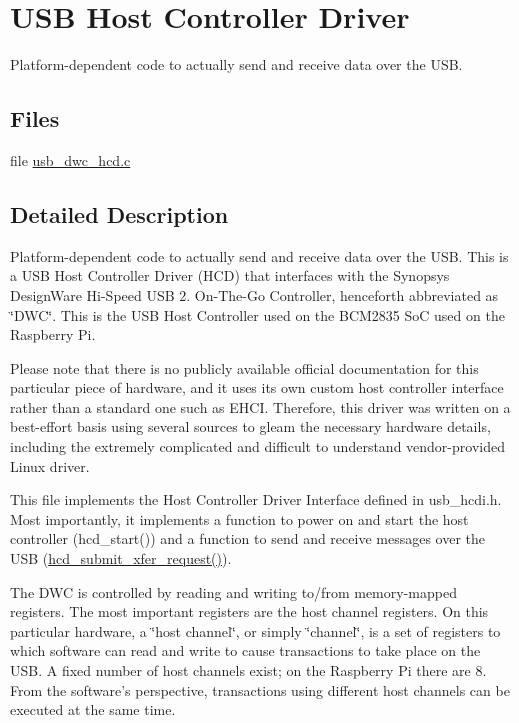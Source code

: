 \hypertarget{group__usbhcd}{\section{U\-S\-B Host Controller Driver}
\label{group__usbhcd}
}


Platform-\/dependent code to actually send and receive data over the U\-S\-B.  


\subsection*{Files}
\begin{DoxyCompactItemize}
\item 
file \hyperlink{usb__dwc__hcd_8c}{usb\-\_\-dwc\-\_\-hcd.\-c}
\end{DoxyCompactItemize}


\subsection{Detailed Description}
Platform-\/dependent code to actually send and receive data over the U\-S\-B. This is a U\-S\-B Host Controller Driver (H\-C\-D) that interfaces with the Synopsys Design\-Ware Hi-\/\-Speed U\-S\-B 2. On-\/\-The-\/\-Go Controller, henceforth abbreviated as \char`\"{}\-D\-W\-C\char`\"{}. This is the U\-S\-B Host Controller used on the B\-C\-M2835 So\-C used on the Raspberry Pi.

Please note that there is no publicly available official documentation for this particular piece of hardware, and it uses its own custom host controller interface rather than a standard one such as E\-H\-C\-I. Therefore, this driver was written on a best-\/effort basis using several sources to gleam the necessary hardware details, including the extremely complicated and difficult to understand vendor-\/provided Linux driver.

This file implements the Host Controller Driver Interface defined in usb\-\_\-hcdi.\-h. Most importantly, it implements a function to power on and start the host controller (hcd\-\_\-start()) and a function to send and receive messages over the U\-S\-B (\hyperlink{usb__dwc__hcd_8c_a72b7448515ed0c92480cb6737009e626}{hcd\-\_\-submit\-\_\-xfer\-\_\-request()}).

The D\-W\-C is controlled by reading and writing to/from memory-\/mapped registers. The most important registers are the host channel registers. On this particular hardware, a \char`\"{}host channel\char`\"{}, or simply \char`\"{}channel\char`\"{}, is a set of registers to which software can read and write to cause transactions to take place on the U\-S\-B. A fixed number of host channels exist; on the Raspberry Pi there are 8. From the software's perspective, transactions using different host channels can be executed at the same time.

